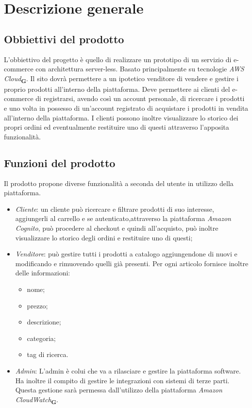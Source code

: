 \section{Descrizione generale}
\subsection{Obbiettivi del prodotto}
L'obbiettivo del progetto è quello di realizzare un prototipo di un servizio di e-commerce con architettura server-less. Basato principalmente su tecnologie \textit{AWS Cloud}\textsubscript{\textbf{G}}. Il sito dovrà permettere a un ipotetico venditore di vendere e gestire i proprio prodotti all'interno della piattaforma. Deve permettere ai clienti del e-commerce di registrarsi, avendo così un account personale, di ricercare i prodotti e uno volta in possesso di un'account registrato di acquistare i prodotti in vendita all'interno della piattaforma. I clienti possono inoltre visualizzare lo storico dei propri ordini ed eventualmente restituire uno di questi attraverso l'apposita funzionalità.
\subsection{Funzioni del prodotto}
Il prodotto propone diverse funzionalità a seconda del utente in utilizzo della piattaforma.
\begin{itemize}
    \item \textit{Cliente}: un cliente può ricercare e filtrare prodotti di suo interesse, aggiungerli al carrello e se autenticato,attraverso la piattaforma \textit{Amazon Cognito}, può procedere al checkout e quindi all'acquisto, può inoltre visualizzare lo storico degli ordini e restituire uno di questi;
    \item \textit{Venditore}: può gestire tutti i prodotti a catalogo aggiungendone di nuovi e modificando e rimuovendo quelli già presenti. Per ogni articolo fornisce inoltre delle  informazioni:
    \begin{itemize}
        \item nome;
        \item prezzo;
        \item descrizione;
        \item categoria;
        \item tag di ricerca.
    \end{itemize}
    \item \textit{Admin}: L'admin è colui che va a rilasciare e gestire la piattaforma software. Ha inoltre il compito di gestire le integrazioni con sistemi di terze parti. Questa gestione sarà permessa dall'utilizzo della piattaforma \textit{Amazon CloudWatch}\textsubscript{\textbf{G}}.
\end{itemize}
